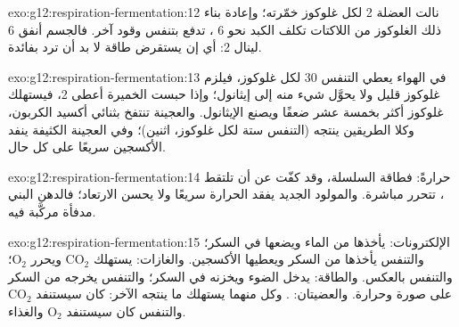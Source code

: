 \begin{solution}{exo:g12:respiration-fermentation:12}
نالت العضلة 2  لكل غلوكوز خمّرته؛ وإعادة بناء ذلك الغلوكوز من
اللاكتات تكلف الكبد نحو 6 ، تدفع بتنفس وقود آخر. فالجسم أنفق 6
لينال 2: أي إن  يستقرض طاقة لا بد أن ترد بفائدة.
\end{solution}

\begin{solution}{exo:g12:respiration-fermentation:13}
في الهواء يعطي التنفس 30  لكل غلوكوز، فيلزم غلوكوز قليل ولا يحوَّل
شيء منه إلى إيثانول؛ وإذا حبست الخميرة أعطى  2، فيستهلك غلوكوز
أكثر بخمسة عشر ضعفًا ويصنع الإيثانول. والعجينة تنتفخ بثنائي أكسيد
الكربون، وكلا الطريقين ينتجه (التنفس ستة لكل غلوكوز،  اثنين)؛
وفي العجينة الكثيفة ينفد الأكسجين سريعًا على كل حال.
\end{solution}

\begin{solution}{exo:g12:respiration-fermentation:14}
حرارةً: فطاقة السلسلة، وقد كفّت عن أن تلتقط ، تتحرر مباشرة. والمولود
الجديد يفقد الحرارة سريعًا ولا يحسن الارتعاد؛ فالدهن البني مدفأة
مركَّبة فيه.
\end{solution}

\begin{solution}{exo:g12:respiration-fermentation:15}
الإلكترونات:  يأخذها من الماء ويضعها في السكر؛ والتنفس
يأخذها من السكر ويعطيها الأكسجين. والغازات:  يستهلك
$\mathrm{CO_2}$ ويحرر $\mathrm{O_2}$؛ والتنفس بالعكس. والطاقة:
 يدخل الضوء ويخزنه في السكر؛ والتنفس يخرجه من السكر
على صورة  وحرارة. والعضيتان:  . وكل
منهما يستهلك ما ينتجه الآخر:  كان سيستنفد
$\mathrm{CO_2}$ والتنفس كان سيستنفد $\mathrm{O_2}$ والغذاء.
\end{solution}

